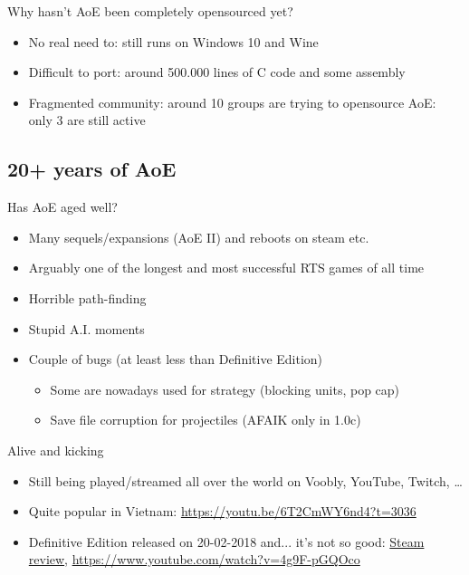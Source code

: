 \documentclass{beamer}
\begin{document}

\begin{frame}{Why hasn't AoE been completely opensourced yet?}
	\begin{itemize}
		\item No real need to: still runs on Windows 10 and Wine
		\item Difficult to port: around 500.000 lines of C code and some assembly
		\item Fragmented community: around 10 groups are trying to opensource AoE: only 3 are still active
	\end{itemize}

\end{frame}


\subsection{20+ years of AoE}

\begin{frame}{Has AoE aged well?}
	\begin{itemize}
		\item Many sequels/expansions (AoE II) and reboots on steam etc.
		\item Arguably one of the longest and most successful RTS games of all time
		\item Horrible path-finding
		\item Stupid A.I. moments
		\item Couple of bugs (at least less than Definitive Edition)
		\begin{itemize}
			\item Some are nowadays used for strategy (blocking units, pop cap)
			\item Save file corruption for projectiles (AFAIK only in 1.0c)
		\end{itemize}
	\end{itemize}

\end{frame}


\begin{frame}{Alive and kicking}
	\begin{itemize}
		\item Still being played/streamed all over the world on Voobly, YouTube, Twitch, \dots
		\item Quite popular in Vietnam: \url{https://youtu.be/6T2CmWY6nd4?t=3036}
		\item Definitive Edition released on 20-02-2018 and... it's not so good:
		\href{https://steamcommunity.com/id/youshallnothash/recommended/1017900/}{Steam review},
		\url{https://www.youtube.com/watch?v=4g9F-pGQOco}
	\end{itemize}

\end{frame}
\end{document}
